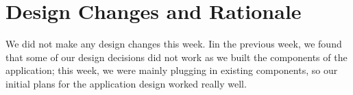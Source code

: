 \section{Design Changes and Rationale}

We did not make any design changes this week. Iin the previous week, we found that some of our design decisions did not work as we built the components of the application; this week, we were mainly plugging in existing components, so our initial plans for the application design worked really well.